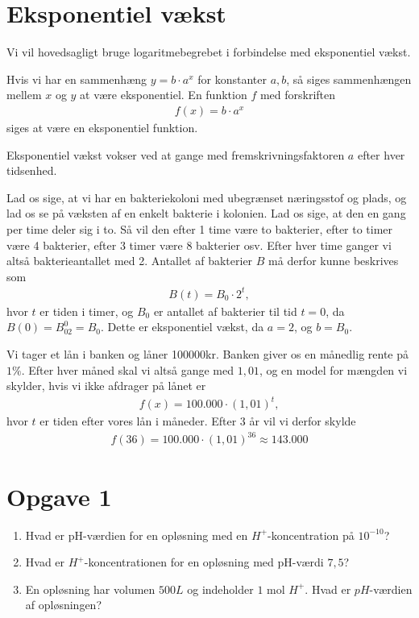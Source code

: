 \documentclass[12pt]{article}
\begin{document}
\section*{Eksponentiel vækst}
Vi vil hovedsagligt bruge logaritmebegrebet i forbindelse med eksponentiel vækst. 
\begin{defn}
Hvis vi har en sammenhæng $y = b\cdot a^x$ for konstanter $a,b$, så siges sammenhængen mellem $x$ og $y$ at være eksponentiel. En funktion $f$ med forskriften
\begin{align*}
f(x) = b\cdot a^x
\end{align*}
siges at være en eksponentiel funktion. 
\end{defn}
Eksponentiel vækst vokser ved at gange med fremskrivningsfaktoren $a$ efter hver tidsenhed.
\begin{exa}
Lad os sige, at vi har en bakteriekoloni med ubegrænset næringsstof og plads, og lad os se på væksten af en enkelt bakterie i kolonien. Lad os sige, at den en gang per time deler sig i to. Så vil den efter 1 time være to bakterier, efter to timer være 4 bakterier, efter 3 timer være 8 bakterier osv. Efter hver time ganger vi altså bakterieantallet med 2. Antallet af bakterier $B$ må derfor kunne beskrives som 
\begin{align*}
B(t) = B_0\cdot 2^t,
\end{align*}
hvor $t$ er tiden i timer, og $B_0$ er antallet af bakterier til tid $t=0$, da $B(0) = B_02^0 = B_0.$
Dette er eksponentiel vækst, da $a = 2$, og $b = B_0$.
\end{exa}
\begin{exa}
Vi tager et lån i banken og låner 100000kr. Banken giver os en månedlig rente på $1\%$. Efter hver måned skal vi altså gange med $1,01$, og en model for mængden vi skylder, hvis vi ikke afdrager på lånet er
\begin{align*}
f(x) = 100.000\cdot (1,01)^t,
\end{align*}
hvor $t$ er tiden efter vores lån i måneder. Efter 3 år vil vi derfor skylde
\begin{align*}
f(36) = 100.000\cdot (1,01)^{36} \approx 143.000
\end{align*}
\end{exa} 



\section*{Opgave 1}
\begin{enumerate}[label=\roman*)]
\item Hvad er pH-værdien for en opløsning med en $H^+$-koncentration på $10^{-10}$?
\item Hvad er $H^+$-koncentrationen for en opløsning med pH-værdi $7,5$?
\item En opløsning har volumen $500L$ og indeholder $1$ mol $H^+$. Hvad er $pH$-værdien af opløsningen?
\end{enumerate}
\end{document}
